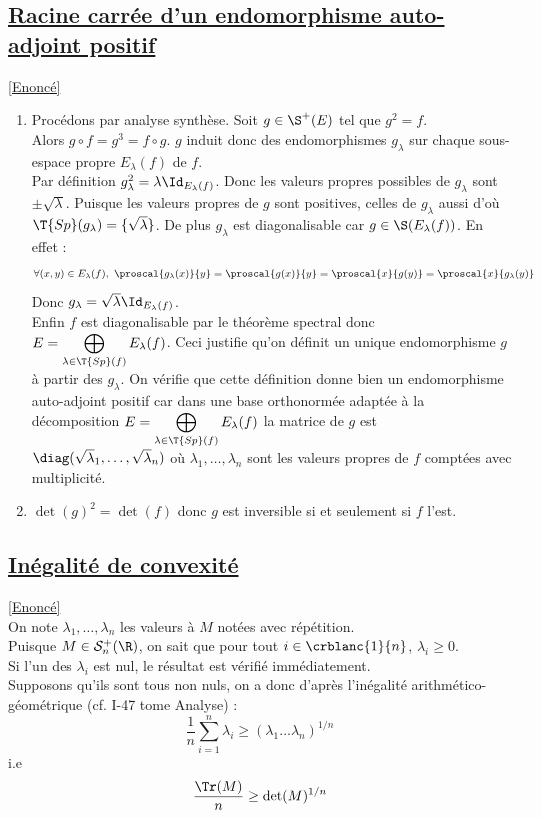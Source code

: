 \documentclass[8pt]{book}
\begin{document}
	\subsection{\underline{Racine carrée d'un endomorphisme auto-adjoint positif} }
	\textcolor{blue}{\hyperref[Racine carrée d'un endomorphisme auto-adjoint positif]{[Enoncé]}}\\
	\label{Racine carrée d'un endomorphisme auto-adjoint positif corrigé}
	\begin{enumerate}
		\item Procédons par analyse synthèse. Soit $g\in \S^+(E)$ tel que $g^2=f$.\\
		Alors $g\circ f=g^3=f\circ g$. $g$ induit donc des endomorphismes $g_\lambda$ sur chaque sous-espace propre $E_\lambda(f)$ de $f$.\\
		Par définition $g_\lambda^2=\lambda\Id_{E_\lambda(f)}$. Donc les valeurs propres possibles de $g_\lambda$ sont $\pm\sqrt\lambda$. Puisque les valeurs propres de $g$ sont positives, celles de $g_\lambda$ aussi d'où $\T{Sp}(g_\lambda)=\{\sqrt\lambda\}$. De plus $g_\lambda$ est diagonalisable car $g\in \S(E_\lambda(f))$. En effet :
		$$\forall (x,y)\in E_\lambda(f),\ \proscal{g_\lambda(x)}{y}=\proscal{g(x)}{y}=\proscal{x}{g(y)}=\proscal{x}{g_\lambda(y)}$$
		Donc $g_\lambda=\sqrt\lambda\Id_{E_\lambda(f)}$.\\
		Enfin $f$ est diagonalisable par le théorème spectral donc $E=\displaystyle\bigoplus_{\lambda\in \T{Sp}(f)}E_\lambda(f)$. Ceci justifie qu'on définit un unique endomorphisme $g$ à partir des $g_\lambda$. On vérifie que cette définition donne bien un endomorphisme auto-adjoint positif car dans une base orthonormée adaptée à la décomposition $E=\displaystyle\bigoplus_{\lambda\in \T{Sp}(f)}E_\lambda(f)$ la matrice de $g$ est $\diag(\sqrt\lambda_1,\dots,\sqrt\lambda_n)$ où $\lambda_1,\dots,\lambda_n$ sont les valeurs propres de $f$ comptées avec multiplicité.
		\item $\det(g)^2=\det(f)$ donc $g$ est inversible si et seulement si $f$ l'est.
	\end{enumerate}
	
	\subsection{\underline{Inégalité de convexité} }
	\label{Inégalité de convexité corrigé}
	\textcolor{blue}{\hyperref[Inégalité de convexité]{[Enoncé]}}\\
	On note $\lambda_1, \dots, \lambda_n$ les valeurs à $M$ notées avec répétition.\\
	Puisque $M\in\mathcal S^+_n(\R)$, on sait que pour tout $i\in\crblanc{1}{n}$, $\lambda_i\geq 0$.\\
	Si l'un des $\lambda_i$ est nul, le résultat est vérifié immédiatement.\\
	Supposons qu'ils sont tous non nuls, on a donc d'après l'inégalité arithmético-géométrique (cf. I-47 tome Analyse) :
	\[\frac{1}{n}\sum_{i=1}^{n}\lambda_i\geq (\lambda_1\dots\lambda_n)^{1/n}\]
	i.e \[\frac{\Tr(M)}{n}\geq \det(M)^{1/n}\]
	
\end{document}
